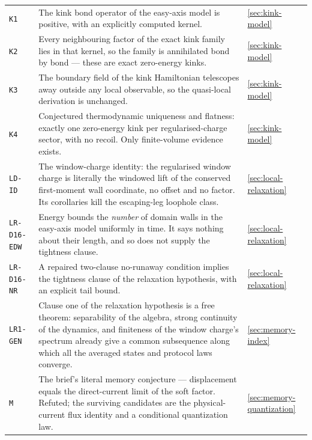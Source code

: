 {\begin{longtable}{@{}p{}p{}p{}@{}}
\texttt{K1} & The kink bond operator of the easy-axis model is positive, with
an explicitly computed kernel. & \cref{sec:kink-model}\\

\texttt{K2} & Every neighbouring factor of the exact kink family lies in that
kernel, so the family is annihilated bond by bond --- these are exact
zero-energy kinks. & \cref{sec:kink-model}\\

\texttt{K3} & The boundary field of the kink Hamiltonian telescopes away
outside any local observable, so the quasi-local derivation is unchanged. & \cref{sec:kink-model}\\

\texttt{K4} & Conjectured thermodynamic uniqueness and flatness: exactly one
zero-energy kink per regularised-charge sector, with no recoil. Only
finite-volume evidence exists. & \cref{sec:kink-model}\\

\texttt{LD-ID} & The window-charge identity: the regularised window charge is
literally the windowed lift of the conserved first-moment wall coordinate, no
offset and no factor. Its corollaries kill the escaping-leg loophole class. & \cref{sec:local-relaxation}\\

\texttt{LR-D16-EDW} & Energy bounds the \emph{number} of domain walls in the
easy-axis model uniformly in time. It says nothing about their length, and so
does not supply the tightness clause. & \cref{sec:local-relaxation}\\

\texttt{LR-D16-NR} & A repaired two-clause no-runaway condition implies the
tightness clause of the relaxation hypothesis, with an explicit tail bound. & \cref{sec:local-relaxation}\\

\texttt{LR1-GEN} & Clause one of the relaxation hypothesis is a free theorem:
separability of the algebra, strong continuity of the dynamics, and finiteness
of the window charge's spectrum already give a common subsequence along which
all the averaged states and protocol laws converge. & \cref{sec:memory-index}\\

\texttt{M} & The brief's literal memory conjecture --- displacement equals the
direct-current limit of the soft factor. Refuted; the surviving candidates are
the physical-current flux identity and a conditional quantization law. & \cref{sec:memory-quantization}\\


\end{longtable}}
